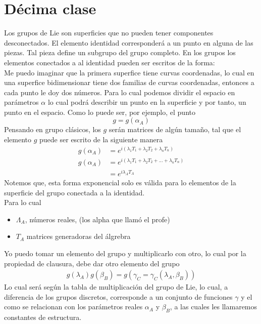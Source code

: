 \documentclass[../main.tex]{subfiles}
\begin{document}
\section{Décima clase}
Los grupos de Lie son superficies que no pueden tener componentes desconectados. El elemento identidad corresponderá a un punto en alguna de las piezas. Tal pieza define un subgrupo del grupo completo. En los grupos los elementos conectados a al identidad pueden ser escritos de la forma: \\
Me puedo imaginar que la primera superfice tiene curvas coordenadas, lo cual en una superfice bidimensionar tiene dos familias de curvas coordenadas, entonces a cada punto le doy dos números. Para lo cual podemos dividir el espacio en parámetros $\alpha$ lo cual podrá describir un punto en la superficie y por tanto, un punto en el espacio. Como lo puede ser, por ejemplo, el punto
\begin{equation*}
  g = g(\alpha_A)
\end{equation*}
Pensando en grupo clásicos, los $g$ serán matrices de algún tamaño, tal que el elemento $g$ puede ser escrito de la siguiente manera
\begin{align*}
  g(\alpha_A)  & = e^{i(\lambda_1T_1+\lambda_2T_2 +\lambda_nT_n)} \\
  g(\alpha_A)  & = e^{i(\lambda_1T_1+\lambda_2T_2 + ... +\lambda_nT_n)} \\
  & = e^{i\lambda_AT_A}
\end{align*}
Notemos que, esta forma exponencial solo es válida para lo elementos de la superficie del grupo conectada a la identidad. \\
Para lo cual
\begin{itemize}
  \item $\Lambda_A$, números reales, (los alpha que llamó el profe)
  \item $T_A$ matrices generadoras del álgrebra 
\end{itemize}
Yo puedo tomar un elemento del grupo y multiplicarlo con otro, lo cual por la propiedad de clausura, debe dar otro elemento del grupo
\begin{align*}
  g(\lambda_A) g(\beta_B) = g(\gamma_C= \gamma_C(\lambda_A,\beta_B))
\end{align*}
Lo cual será según la tabla de multiplicación del grupo de Lie, lo cual, a diferencia de los grupos discretos, corresponde a un conjunto de funciones $\gamma$ y el como se relacionan con los parámetros reales $\alpha_A$ y $\beta_B$, a las cuales les llamaremos constantes de estructura. 
\end{document}
